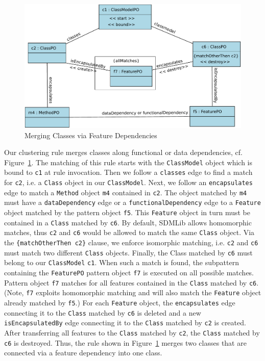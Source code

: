\documentclass[a4paper]{article}
\begin{document}
 
\begin{figure}[ht] \centering
	\includegraphics[width=\linewidth]{images/RuleMergeDep.pdf}
 \caption{Merging Classes via Feature Dependencies}
 \label{fig:MergeAttributeRule}
\end{figure}  

Our clustering rule merges classes along functional or data dependencies, 
cf. Figure~\ref{fig:MergeAttributeRule}. The matching of this rule starts with the \texttt{ClassModel} object which 
is bound to \texttt{c1} at rule invocation. Then we follow a \texttt{classes}
 edge to find a match for \texttt{c2}, i.e. a \texttt{Class} object in our 
\texttt{ClassModel}. Next, we follow an \texttt{encapsulates} edge to match 
a \texttt{Method} object \texttt{m4} contained in \texttt{c2}. The object 
matched by \texttt{m4} must have a \texttt{dataDependency} edge 
or a \texttt{functionalDependency} edge to a \texttt{Feature} object 
matched by the pattern object \texttt{f5}. This 
\texttt{Feature} object in turn must be contained in a \texttt{Class} matched by 
\texttt{c6}. By default, SDMLib allows homomorphic matches, thus \texttt{c2} 
and \texttt{c6} would be allowed to match the same \texttt{Class} object. 
Via the \texttt{\{matchOtherThen c2\}} clause, we enforce isomorphic 
matching, i.e. \texttt{c2} and \texttt{c6} must match two different 
\texttt{Class} objects. Finally, the Class matched by \texttt{c6} must belong to our 
\texttt{ClassModel} \texttt{c1}. When such a match is found, the subpattern 
containing the \texttt{FeaturePO} pattern object \texttt{f7} is executed on 
all possible matches. Pattern object \texttt{f7} matches for all features 
contained in the \texttt{Class} matched by \texttt{c6}. (Note, \texttt{f7} 
exploits homomorphic matching and will also match the \texttt{Feature} 
object already matched by \texttt{f5}.) For each \texttt{Feature} object, 
the \texttt{encapsulates} edge connecting it to the \texttt{Class} matched 
by \texttt{c6} is deleted and a new \texttt{isEncapsulatedBy} edge 
connecting it to the \texttt{Class} matched by \texttt{c2} is created. After 
transferring all features to the \texttt{Class} matched by \texttt{c2}, the 
\texttt{Class} matched by \texttt{c6} is destroyed. Thus, the rule shown in 
Figure~\ref{fig:MergeAttributeRule} merges two classes that are connected 
via a feature dependency into one class. 
\end{document}
